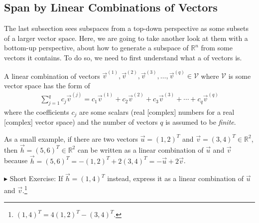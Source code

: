 \subsection{Span by Linear Combinations of Vectors}
\label{section:span}
The last subsection sees subspaces from a top-down perspective as some subsets of a larger vector space. Here, we are going to take another look at them with a bottom-up perspective, about how to generate a subspace of $\mathbb{R}^n$ from some vectors it contains. To do so, we need to first understand what a  of vectors is.
\begin{defn}
\label{defn:linearcomb}
A linear combination of vectors $\vec{v}^{(1)}, \vec{v}^{(2)}, \vec{v}^{(3)}, \ldots, \vec{v}^{(q)} \in \mathcal{V}$ where $\mathcal{V}$ is some vector space has the form of
\begin{align}
\sum_{j=1}^q c_j\vec{v}^{(j)} = c_1\vec{v}^{(1)} + c_2\vec{v}^{(2)} + c_3\vec{v}^{(3)} + \cdots + c_q\vec{v}^{(q)} \label{eqn:linearcomb}
\end{align}
where the coefficients $c_j$ are some scalars (real [complex] numbers for a real [complex] vector space) and the number of vectors $q$ is assumed to be \textit{finite}.
\end{defn}
As a small example, if there are two vectors $\vec{u} = (1,2)^T$ and $\vec{v} = (3,4)^T \in \mathbb{R}^2$, then $\vec{h} = (5,6)^T \in \mathbb{R}^2$ can be written as a linear combination of $\vec{u}$ and $\vec{v}$ because $\vec{h} = (5,6)^T = -(1,2)^T + 2(3,4)^T = -\vec{u} + 2\vec{v}$.\par
$\blacktriangleright$ Short Exercise: If $\vec{h} = (1,4)^T$ instead, express it as a linear combination of $\vec{u}$ and $\vec{v}$.\footnote{$(1,4)^T = 4(1,2)^T - (3,4)^T$.}\par

